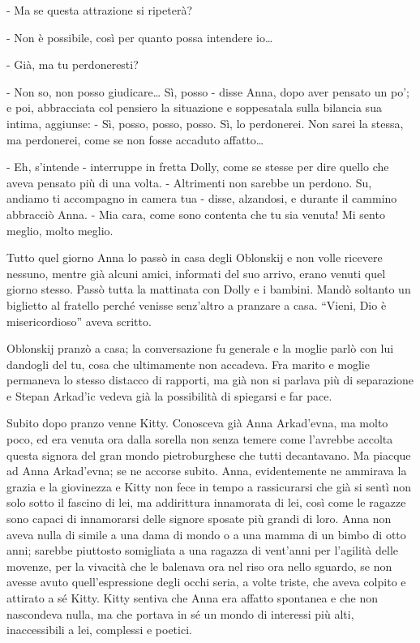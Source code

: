- Ma se questa attrazione si ripeterà? 

- Non è possibile, così per quanto possa intendere io\ldots{} 

- Già, ma tu perdoneresti? 

- Non so, non posso giudicare\ldots{} Sì, posso - disse Anna, dopo aver pensato un po'; e poi, abbracciata col pensiero la situazione e soppesatala sulla bilancia sua intima, aggiunse: - Sì, posso, posso, posso. Sì, lo perdonerei. Non sarei la stessa, ma perdonerei, come se non fosse accaduto affatto\ldots{} 

- Eh, s'intende - interruppe in fretta Dolly, come se stesse per dire quello che aveva pensato più di una volta. - Altrimenti non sarebbe un perdono. Su, andiamo ti accompagno in camera tua - disse, alzandosi, e durante il cammino abbracciò Anna. - Mia cara, come sono contenta che tu sia venuta! Mi sento meglio, molto meglio. 

Tutto quel giorno Anna lo passò in casa degli Oblonskij e non volle ricevere nessuno, mentre già alcuni amici, informati del suo arrivo, erano venuti quel giorno stesso. Passò tutta la mattinata con Dolly e i bambini. Mandò soltanto un biglietto al fratello perché venisse senz'altro a pranzare a casa. ``Vieni, Dio è misericordioso'' aveva scritto. 

Oblonskij pranzò a casa; la conversazione fu generale e la moglie parlò con lui dandogli del tu, cosa che ultimamente non accadeva. Fra marito e moglie permaneva lo stesso distacco di rapporti, ma già non si parlava più di separazione e Stepan Arkad'ic vedeva già la possibilità di spiegarsi e far pace. 

Subito dopo pranzo venne Kitty. Conosceva già Anna Arkad'evna, ma molto poco, ed era venuta ora dalla sorella non senza temere come l'avrebbe accolta questa signora del gran mondo pietroburghese che tutti decantavano. Ma piacque ad Anna Arkad'evna; se ne accorse subito. Anna, evidentemente ne ammirava la grazia e la giovinezza e Kitty non fece in tempo a rassicurarsi che già si sentì non solo sotto il fascino di lei, ma addirittura innamorata di lei, così come le ragazze sono capaci di innamorarsi delle signore sposate più grandi di loro. Anna non aveva nulla di simile a una dama di mondo o a una mamma di un bimbo di otto anni; sarebbe piuttosto somigliata a una ragazza di vent'anni per l'agilità delle movenze, per la vivacità che le balenava ora nel riso ora nello sguardo, se non avesse avuto quell'espressione degli occhi seria, a volte triste, che aveva colpito e attirato a sé Kitty. Kitty sentiva che Anna era affatto spontanea e che non nascondeva nulla, ma che portava in sé un mondo di interessi più alti, inaccessibili a lei, complessi e poetici. 

